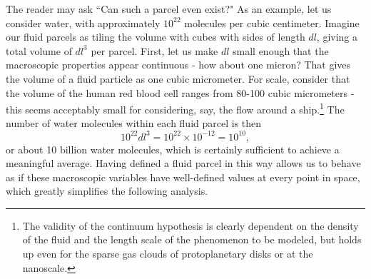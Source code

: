 The reader may ask ``Can such a  parcel even exist?" As an example, let us consider water, with approximately $10^{22}$ molecules per cubic centimeter. Imagine our fluid parcels as tiling the volume with cubes with sides of length $dl$, giving a total volume of $dl^3$ per parcel. First, let us make $dl$ small enough that the macroscopic properties appear continuous - how about one micron? That gives the volume of a fluid particle as one cubic micrometer. For scale, consider that the volume of the human red blood cell ranges from 80-100 cubic micrometers - this seems acceptably small for considering, say, the flow around a ship.\footnote{The validity of the continuum hypothesis is clearly dependent on the density of the fluid and the length scale of the phenomenon to be modeled, but holds up even for the sparse gas clouds of protoplanetary disks or at the nanoscale.} The number of water molecules within each fluid parcel is then 
\begin{equation}
10^{22}dl^3 = 10^{22} \times 10^{-12} = 10^{10},
\end{equation}   
or about 10 billion water molecules, which is certainly sufficient to achieve a meaningful average. Having defined a fluid parcel in this way allows us to behave as if these macroscopic variables have well-defined values at every point in space, which greatly simplifies the following analysis. 

